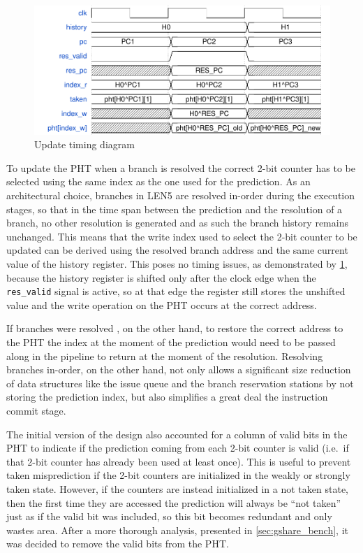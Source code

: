\begin{figure}[hbt]
  \vspace{2cm}
  \centering
  \includegraphics[width=\textwidth]{img/gshare01.pdf}
  \caption{Update timing diagram}
  \label{fig:gshare01}
\end{figure}
To update the \ac{PHT} when a branch is resolved the correct 2-bit counter has to be selected using the same index as the one used for the prediction. As an architectural choice, branches in LEN5 are resolved in-order during the execution stages, so that in the time span between the prediction and the resolution of a branch, no other resolution is generated and as such the branch history remains unchanged. This means that the write index used to select the 2-bit counter to be updated can be derived using the resolved branch address and the same current value of the history register. This poses no timing issues, as demonstrated by \cref{fig:gshare01}, because the history register is shifted only after the clock edge when the \texttt{res\_valid} signal is active, so at that edge the register still stores the unshifted value and the write operation on the \ac{PHT} occurs at the correct address.

If branches were resolved \ooo, on the other hand, to restore the correct address to the \ac{PHT} the index at the moment of the prediction would need to be passed along in the pipeline to return at the moment of the resolution. Resolving branches in-order, on the other hand, not only allows a significant size reduction of data structures like the issue queue and the branch reservation stations by not storing the prediction index, but also simplifies a great deal the instruction commit stage.

The initial version of the design also accounted for a column of valid bits in the \ac{PHT} to indicate if the prediction coming from each 2-bit counter is valid (i.e.\ if that 2-bit counter has already been used at least once). This is useful to prevent taken misprediction if the 2-bit counters are initialized in the weakly or strongly taken state. However, if the counters are instead initialized in a not taken state, then the first time they are accessed the prediction will always be ``not taken'' just as if the valid bit was included, so this bit becomes redundant and only wastes area. After a more thorough analysis, presented in \cref{sec:gshare_bench}, it was decided to remove the valid bits from the \ac{PHT}.

